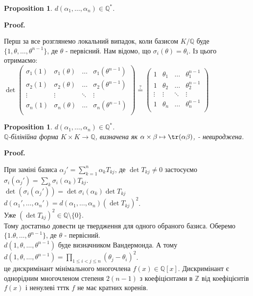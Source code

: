 \documentclass[a4paper, 10pt]{article}
\makeatletter
\theoremstyle{theoremdd}
\theoremstyle{theoremdd}
\theoremstyle{theoremdd}
\theoremstyle{theoremdd}
\theoremstyle{theoremdd}
\newtheorem{proposition}[theorem]{Proposition}
\theoremstyle{theoremdd}
\theoremstyle{theoremdd}
\theoremstyle{theoremdd}
\renewenvironment{proof}[1][Proof.\\]{\par
\pushQED{\hfill \qed}%
\normalfont \topsep6\p@\@plus6\p@\relax
\trivlist
\item\relax
{\bfseries
#1\@addpunct{.}}\hspace\labelsep\ignorespaces
}{%
\popQED\endtrivlist\@endpefalse
}
\makeatother
\begin{document}
\begin{proposition}
$d(\alpha_1,\dots,\alpha_n) \in \mathbb{Q}^*$.
\end{proposition}

\begin{proof}
Перш за все розглянемо локальний випадок, коли базисом $K/\mathbb{Q}$ буде $\{1,\theta,\dots,\theta^{n-1}\}$, де $\theta$ - первісний. Нам відомо, що $\sigma_i(\theta) = \theta_i$. Із цього отримаємо:\\
$\det \begin{pmatrix}
\sigma_1(1) & \sigma_1(\theta) & \dots & \sigma_1(\theta^{n-1}) \\
\sigma_2(1) & \sigma_2(\theta) & \dots & \sigma_2(\theta^{n-1}) \\
\vdots & \vdots & \ddots & \vdots \\
\sigma_n(1) & \sigma_n(\theta) & \dots & \sigma_n(\theta^{n-1}) \\
\end{pmatrix} \overset{?}{=} \begin{pmatrix}
1 & \theta_1 & \dots & \theta_1^{n-1} \\
1 & \theta_2 & \dots & \theta_2^{n-1} \\
\vdots & \vdots & \ddots & \vdots \\
1 & \theta_n & \dots & \theta_n^{n-1} \\
\end{pmatrix}$
\end{proof}

\begin{proposition}
$d(\alpha_1,\dots,\alpha_n) \in \mathbb{Q}^*$.\\
$\mathbb{Q}$-білінійна форма $K \times K \to \mathbb{Q}$, визначена як $\alpha \times \beta \mapsto \tr(\alpha \beta)$, - невироджена.
\end{proposition}

\begin{proof}
При заміні базиса $\alpha_j' = \displaystyle\sum_{k=1}^n \alpha_k T_{kj}$, де $\det T_{kj} \neq 0$ застосуємо $\sigma_i(\alpha_j') = \displaystyle\sum_{k} \sigma_i(\alpha_k) T_{kj}$.\\
$\det (\sigma_i (\alpha_j')) = \det \sigma_i(\alpha_k) \det T_{kj}$\\
$d(\alpha_1',\dots,\alpha_n') = d(\alpha_1,\dots,\alpha_n) (\det T_{kj})^2$.\\
Уже $(\det T_{kj})^2 \in \mathbb{Q} \setminus \{0\}$.\\
Тому достатньо довести це твердження для одного обраного базиса. Оберемо $\{1.\theta,\dots,\theta^{n-1}\}$, де $\theta$ - первісний.\\
$d(1,\theta,\dots,\theta^{n-1})$ буде визначником Вандермонда. А тому\\
$d(1,\theta,\dots,\theta^{n-1}) = \displaystyle\prod_{1 \leq i < j \leq n} (\theta_j - \theta_i)^2$.\\
це дискримінант мінімального многочлена $f(x) \in \mathbb{Q}[x]$. Дискримінант є однорідним многочленом степеня $2(n-1)$ з коефіцієнтами в $\mathbb{Z}$ від коефіцієнтів $f(x)$ і ненулеві тттк $f$ не має кратних коренів.
\end{proof}
\end{document}
